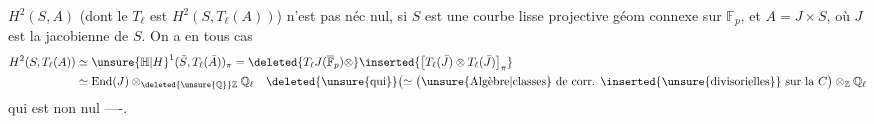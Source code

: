 $H^2(S,A)$  (dont le $T_\ell$ est $H^2(S,T_\ell(A))$) %
n'est pas néc nul,   si $S$ est %
une courbe lisse projective géom connexe sur $\mathbb{F}_p$, %
et $A=J\times S$, où $J$ est la jacobienne de $S$. %
On a en tous cas %
\[
\begin{aligned}
 H^2(S,T_\ell(A)) &\simeq \unsure{\mathbb{H}|H}^{1}(\bar S,T_\ell(\bar A))_{\pi}
 =\deleted{T_\ell J(\overline{\mathbb{F}}_p)\otimes}
 \inserted{\bigl[T_\ell(\bar J)\otimes T_\ell(\bar J)\bigr]_{\pi}}\\ %
 &\simeq\operatorname{End}(J)\otimes_{\deleted{\unsure{\mathbb{Q}}}\mathbb{Z}}\mathbb{Q}_{\ell}
 \quad\deleted{\text{\unsure{qui}}}\bigl(\simeq
 \bigl(\text{\unsure{Algèbre|classes} de corr. }\inserted{\text{\unsure{divisorielles}}}\text{ sur la }C\bigr)
 \otimes_{\mathbb{Z}}\mathbb{Q}_{\ell} %
\end{aligned}
\]
qui est non nul ----. %
